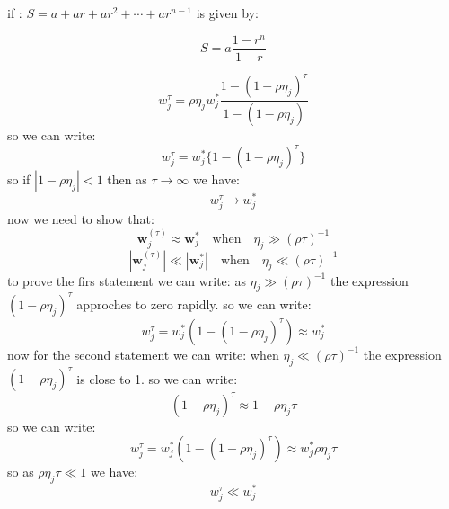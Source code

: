 \begin{qsolve}
\begin{qsolve}[]
        if : \( S = a + ar + ar^2 + \cdots + ar^{n-1} \) is given by:
        
        \[
        S = a \frac{1 - r^n}{1 - r}
        \]
        
        \[
        w_j^{\tau} = \rho \eta_j w_j^* \frac{1 - (1 - \rho \eta_j)^{\tau}}{1 - (1 - \rho \eta_j)}
        \]
        so we can write:
        $$ w_j^{\tau} = w_j^* \{1 - (1 - \rho \eta_j)^{\tau} \}$$
        so if $|1 - \rho \eta_j| < 1$ then as $\tau \to \infty$ we have:
        $$w_j^{\tau} \to w_j^*$$
        now we need to show that:
        $$\mathbf{w}_j^{(\tau)} \approx \mathbf{w}_j^* \quad \text{when} \quad \eta_j \gg (\rho \tau)^{-1}$$
        $$|\mathbf{w}_j^{(\tau)}| \ll |\mathbf{w}_j^*| \quad \text{when} \quad \eta_j \ll (\rho \tau)^{-1}$$
        to prove the firs statement we can write:
        as $\eta_j \gg (\rho \tau)^{-1}$ the expression $(1 - \rho \eta_j)^{\tau}$ approches to zero rapidly. so we can write:
        $$w_j^{\tau} = w_j^* (1 - (1 - \rho \eta_j)^{\tau}) \approx w_j^*$$
        now for the second statement we can write:
        when $\eta_j \ll (\rho \tau)^{-1}$ the expression $(1 - \rho \eta_j)^{\tau}$ is close to 1. so we can write:
        $$(1-\rho \eta_j)^{\tau} \approx 1-\rho \eta_j \tau$$
        \splitqsolve[\splitqsolve]
        so we can write:
        $$w_j^{\tau} = w_j^* (1 - (1 - \rho \eta_j)^{\tau}) \approx w_j^* \rho \eta_j \tau$$
        so as $\rho \eta_j \tau \ll 1$ we have:
        $$w_j^{\tau} \ll w_j^*$$

    \end{qsolve}
\end{qsolve}